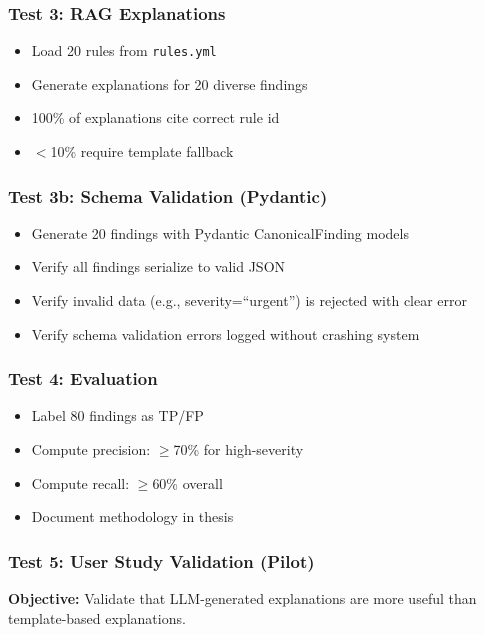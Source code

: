 \documentclass[11pt,a4paper]{article}
\begin{document}
\subsubsection{Test 3: RAG Explanations}
\begin{itemize}[leftmargin=*]
    \item Load 20 rules from \texttt{rules.yml}
    \item Generate explanations for 20 diverse findings
    \item 100\% of explanations cite correct rule id
    \item $<$10\% require template fallback
\end{itemize}

\subsubsection{Test 3b: Schema Validation (Pydantic)}
\begin{itemize}[leftmargin=*]
    \item Generate 20 findings with Pydantic CanonicalFinding models
    \item Verify all findings serialize to valid JSON
    \item Verify invalid data (e.g., severity=``urgent'') is rejected with clear error
    \item Verify schema validation errors logged without crashing system
\end{itemize}

\subsubsection{Test 4: Evaluation}
\begin{itemize}[leftmargin=*]
    \item Label 80 findings as TP/FP
    \item Compute precision: $\geq$70\% for high-severity
    \item Compute recall: $\geq$60\% overall
    \item Document methodology in thesis
\end{itemize}

\subsubsection{Test 5: User Study Validation (Pilot)}

\textbf{Objective:} Validate that LLM-generated explanations are more useful than template-based explanations.
\end{document}
